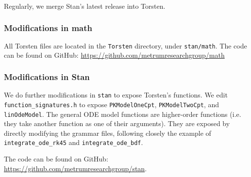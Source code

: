 \documentclass[11pt]{amsart}
\begin{document}
Regularly, we merge Stan's latest release into Torsten.

\subsubsection*{Modifications in math}
All Torsten files are located in the \texttt{Torsten} directory, under \texttt{stan/math}. The code can be found on GitHub: \url{https://github.com/metrumresearchgroup/math} 

\subsubsection*{Modifications in Stan}
We do further modifications in \texttt{stan} to expose Torsten's functions. We edit \texttt{function\_signatures.h} to expose \texttt{PKModelOneCpt}, \texttt{PKModelTwoCpt}, and \texttt{linOdeModel}. The general ODE model functions are higher-order functions (i.e. they take another function as one of their arguments). They are exposed by directly modifying the grammar files, following closely the example of \texttt{integrate\_ode\_rk45} and \texttt{integrate\_ode\_bdf}.

The code can be found on GitHub:  \url{https://github.com/metrumresearchgroup/stan}.









\end{document}
